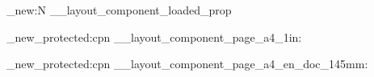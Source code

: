 
\ExplSyntaxOn

\prop_new:N \g__layout_component_loaded_prop
\providecommand{\NextBeamerRegisterSection}[2]{}

\makeatletter

\newcommand{\NextLayoutPageOneIn}{
  \if@twoside
    \RequirePackage[a4paper,margin=1in,bindingoffset=0.4cm]{geometry}
  \else
    \RequirePackage[a4paper,margin=1in]{geometry}
  \fi
}

\newcommand{\NextLayoutPageTwentySixMm}{
  \if@twoside
    \RequirePackage[a4paper,margin=2.6cm,bindingoffset=0.4cm]{geometry}
  \else
    \RequirePackage[a4paper,margin=2.6cm]{geometry}
  \fi
}

\newcommand{\NextLayoutHeadFancyChapter}{
  \RequirePackage{fancyhdr}
  \pagestyle{fancy}
  \fancyhf{}
  \renewcommand{\chaptermark}[1]{\NextSetRunningHeader{##1}\markboth{##1}{}}
  \renewcommand{\sectionmark}[1]{}
  \renewcommand{\subsectionmark}[1]{}
  \renewcommand{\subsubsectionmark}[1]{}
  \if@twoside
    \fancyhead[LE]{\small\thepage}
    \fancyhead[RE]{\itshape\small\NextHeaderTitleContent}
    \fancyhead[LO]{\itshape\small\NextRunningHeaderContent}
    \fancyhead[RO]{\small\thepage}
  \else
    \fancyhead[L]{\itshape\small\NextHeaderTitleContent}
    \fancyhead[R]{\small\thepage}
  \fi
  \renewcommand{\headrulewidth}{0.4pt}
  \renewcommand{\footrulewidth}{0pt}
  \setlength{\headheight}{14pt}
  \fancypagestyle{plain}{
    \fancyhf{}
    \renewcommand{\headrulewidth}{0pt}
    \renewcommand{\footrulewidth}{0pt}
  }
}

\newcommand{\NextLayoutBookOpenRight}{
  \@openrighttrue
}

\newcommand{\NextLayoutBookBlankPageEmpty}{
  \renewcommand{\cleardoublepage}{
    \clearpage
    \if@twoside
      \ifodd\c@page
      \else
        \hbox{}
        \thispagestyle{empty}
        \newpage
        \if@twocolumn
          \hbox{}
          \newpage
        \fi
      \fi
    \fi
  }
}

\makeatother

\cs_new_protected:cpn { __layout_component_page_a4_1in: }
  { \NextLayoutPageOneIn }

\cs_new_protected:cpn { __layout_component_page_a4_en_doc_145mm: }
  {
    \if@twoside
      \RequirePackage[a4paper,margin=32.5mm,bindingoffset=4mm]{geometry}
    \else
      \RequirePackage[a4paper,margin=32.5mm]{geometry}
    \fi
  }

